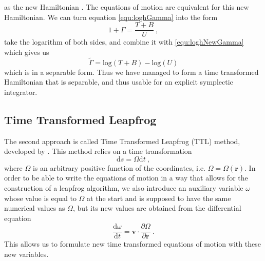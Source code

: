\documentclass[english, oneside]{HYgradu}
\begin{document}
as the new Hamiltonian \citep{mikkola:1999}. The equations of motion are equivalent for this new Hamiltonian.
We can turn equation \eqref{equ:loghGamma} into the form 
\begin{equation}
1 + \Gamma = \frac{T+B}{U} \ ,
\end{equation}
take the logarithm of both sides, and combine it with \eqref{equ:loghNewGamma} which gives us 
\begin{equation}
\tilde{\Gamma} = \mathrm{log}(T+B) - \mathrm{log}(U)
\end{equation}
which is in a separable form. Thus we have managed to form a time transformed Hamiltonian that is separable, and thus usable for an explicit symplectic integrator. 

\subsection{Time Transformed Leapfrog}
The second approach is called Time Transformed Leapfrog (TTL) method, developed by \cite{mikkola:2002}. This method relies on a time transformation
\begin{equation}
\mathrm{d}s = \Omega \mathrm{d}t \ ,
\end{equation}
where $\Omega$ is an arbitrary positive function of the coordinates, i.e. $\Omega = \Omega(\boldsymbol{r})$. In order to be able to write the equations of motion in a way that allows for the construction of a leapfrog algorithm, we also introduce an auxiliary variable $\omega$ whose value is equal to $\Omega$ at the start and is supposed to have the same numerical values as $\Omega$, but its new values are obtained from the differential equation
\begin{equation}
\frac{\mathrm{d}\omega}{\mathrm{d}t} = \boldsymbol{v} \cdot \frac{\partial \Omega}{\partial \boldsymbol{r}} \ .
\end{equation}
This allows us to formulate new time transformed equations of motion with these new variables.
\end{document}

